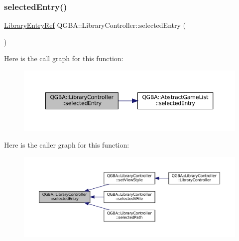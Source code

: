 \subsubsection{\texorpdfstring{selected\+Entry()}{selectedEntry()}}
{\footnotesize\ttfamily \mbox{\hyperlink{namespace_q_g_b_a_a201fa9f2cb8f778666a134ba81909358}{Library\+Entry\+Ref}} Q\+G\+B\+A\+::\+Library\+Controller\+::selected\+Entry (\begin{DoxyParamCaption}{ }\end{DoxyParamCaption})}

Here is the call graph for this function\+:
\nopagebreak
\begin{figure}[H]
\begin{center}
\leavevmode
\includegraphics[width=350pt]{class_q_g_b_a_1_1_library_controller_afa408861ab054246525f8d2b62610133_cgraph}
\end{center}
\end{figure}
Here is the caller graph for this function\+:
\nopagebreak
\begin{figure}[H]
\begin{center}
\leavevmode
\includegraphics[width=350pt]{class_q_g_b_a_1_1_library_controller_afa408861ab054246525f8d2b62610133_icgraph}
\end{center}
\end{figure}
\mbox{\label{class_q_g_b_a_1_1_library_controller_a3ab757f52f47c97e0e9b753d51e7a7bd}} 
